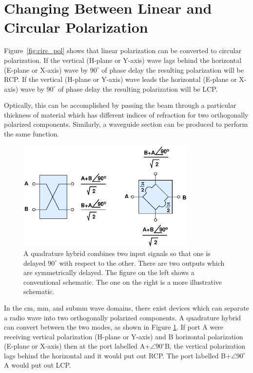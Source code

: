 \documentclass[letterpaper,11pt]{book}
\begin{document}
\section{Changing Between Linear and Circular
Polarization}\label{sec:lin-circ}

Figure~\ref{fig:circ_pol} shows that linear polarization can be converted to 
circular polarization.  If the vertical (H-plane or Y-axis) wave lags
behind the horizontal (E-plane or X-axis) wave by $90^{\circ}$ of
phase delay the resulting polarization will be RCP.
If the vertical (H-plane or Y-axis) wave leads
the horizontal (E-plane or X-axis) wave by $90^{\circ}$ of
phase delay the resulting polarization will be LCP.

Optically, this can be accomplished
by passing the beam through a particular thickness of material which
has different indices of refraction for two orthogonally polarized
components. Similarly, a waveguide section can be produced to perform the
same function.

\begin{figure}[h!tb]
\begin{center}
\includegraphics[width=3.5in]{quad_hybrid.eps}
\caption[Quadrature hybrid]{\label{fig:quad-hybrid}A quadrature hybrid
combines two input signals so that one is delayed $90^{\circ}$
with respect to the other. There are two outputs which are
symmetrically delayed.  The figure on the left shows a
conventional schematic.  The one on the right is a more
illustrative schematic.}
\end{center}
\end{figure}
In the cm, mm, and submm wave domains, there exist devices which can
separate a radio wave into two orthogonally polarized components.
A quadrature hybrid can convert between the two modes, as shown in
Figure \ref{fig:quad-hybrid}. If port A were receiving
vertical polarization (H-plane or Y-axis) and B horizontal polarization 
(E-plane or X-axis) then at the port labelled A+$\angle 90^{\circ}$B, the
vertical polarization lags behind the horizontal and it would put out RCP.
The port labelled B+$\angle 90^{\circ}$A would put out LCP.
\end{document}
